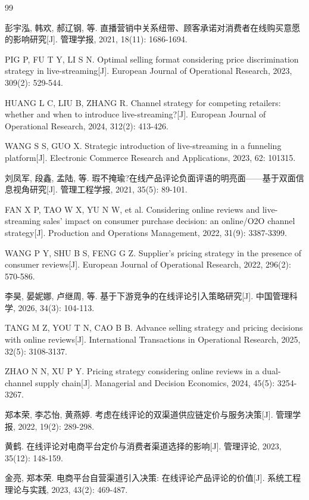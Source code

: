 \documentclass[12pt,a4paper]{article}
\begin{document}
\begin{thebibliography}{99}

彭宇泓, 韩欢, 郝辽钢, 等. 直播营销中关系纽带、顾客承诺对消费者在线购买意愿的影响研究[J]. 管理学报, 2021, 18(11): 1686-1694.

PIG P, FU T Y, LI S N. Optimal selling format considering price discrimination strategy in live-streaming[J]. European Journal of Operational Research, 2023, 309(2): 529-544.

HUANG L C, LIU B, ZHANG R. Channel strategy for competing retailers: whether and when to introduce live-streaming?[J]. European Journal of Operational Research, 2024, 312(2): 413-426.

WANG S S, GUO X. Strategic introduction of live-streaming in a funneling platform[J]. Electronic Commerce Research and Applications, 2023, 62: 101315.

刘凤军, 段鑫, 孟陆, 等. 瑕不掩瑜?在线产品评论负面评语的明亮面——基于双面信息视角研究[J]. 管理工程学报, 2021, 35(5): 89-101.

FAN X P, TAO W X, YU N W, et al. Considering online reviews and live-streaming sales' impact on consumer purchase decision: an online/O2O channel strategy[J]. Production and Operations Management, 2022, 31(9): 3387-3399.

WANG P Y, SHU B S, FENG G Z. Supplier's pricing strategy in the presence of consumer reviews[J]. European Journal of Operational Research, 2022, 296(2): 570-586.

李昊, 晏妮娜, 卢继周, 等. 基于下游竞争的在线评论引入策略研究[J]. 中国管理科学, 2026, 34(3): 104-113.

TANG M Z, YOU T N, CAO B B. Advance selling strategy and pricing decisions with online reviews[J]. International Transactions in Operational Research, 2025, 32(5): 3108-3137.

ZHAO N N, XU P Y. Pricing strategy considering online reviews in a dual-channel supply chain[J]. Managerial and Decision Economics, 2024, 45(5): 3254-3267.

郑本荣, 李芯怡, 黄燕婷. 考虑在线评论的双渠道供应链定价与服务决策[J]. 管理学报, 2022, 19(2): 289-298.

黄鹤. 在线评论对电商平台定价与消费者渠道选择的影响[J]. 管理评论, 2023, 35(12): 148-159.

金亮, 郑本荣. 电商平台自营渠道引入决策: 在线评论产品评论的价值[J]. 系统工程理论与实践, 2023, 43(2): 469-487.


\end{thebibliography}
\end{document}
